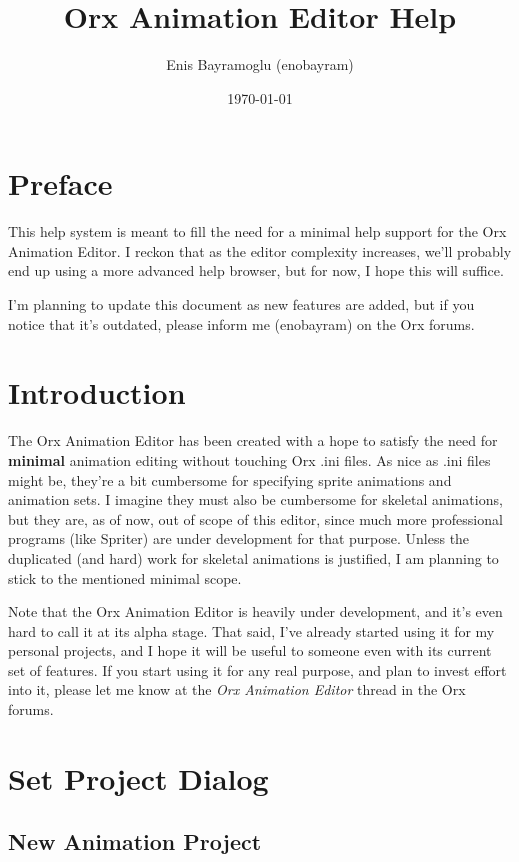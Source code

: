 \documentclass{article}
\title{Orx Animation Editor Help}
\author{Enis Bayramoglu (enobayram)}
\date{\today}
\begin{document}
\maketitle
\tableofcontents

\section{Preface}
This help system is meant to fill the need for a minimal help support for the Orx Animation Editor. I reckon that as the editor complexity increases,
we'll probably end up using a more advanced help browser, but for now, I hope this will suffice.

I'm planning to update this document as new features are added, but if you notice that it's outdated, please inform me (enobayram) on the Orx forums.

\section{Introduction}
The Orx Animation Editor has been created with a hope to satisfy the need for \textbf{minimal} animation editing without touching Orx .ini files. As nice as
.ini files might be, they're a bit cumbersome for specifying sprite animations and animation sets. I imagine they must also be cumbersome for skeletal
animations, but they are, as of now, out of scope of this editor, since much more professional programs (like Spriter) are under development for that purpose. Unless the duplicated (and hard) work for skeletal animations is justified, I am planning to stick to the mentioned minimal scope.

Note that the Orx Animation Editor is heavily under development, and it's even hard to call it at its alpha stage. That said, I've already started using it for
my personal projects, and I hope it will be useful to someone even with its current set of features. If you start using it for any real purpose, and plan to invest
effort into it, please let me know at the \textit{Orx Animation Editor} thread in the Orx forums.

\section{Set Project Dialog}

\subsection{New Animation Project}
\end{document}
